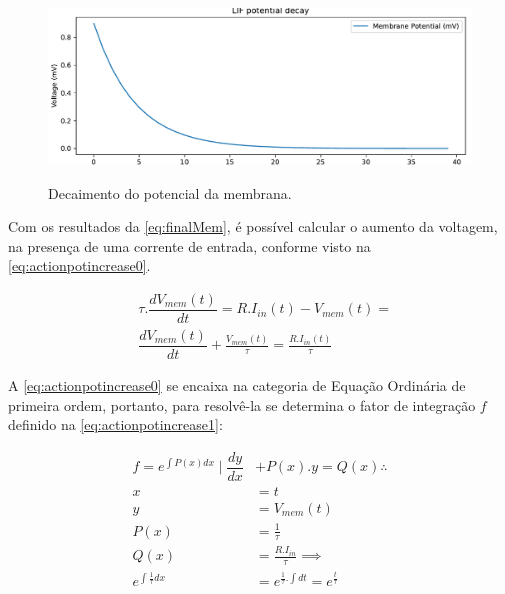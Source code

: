			
			
			\begin{figure}[H]
				\centering
				\caption{Decaimento do potencial da membrana.}
				\includegraphics[width=.7\linewidth]{images/membranePotentialDecay}
				\label{fig:membranepotentialdecay}
			\end{figure}
			
			\par Com os resultados da \autoref{eq:finalMem}, é possível calcular o aumento da voltagem, na presença de uma corrente de entrada, conforme visto na \autoref{eq:actionpotincrease0}.
			
			\begin{equation}
				\label{eq:actionpotincrease0}
				\begin{aligned}
					&\tau.\dfrac{dV_{mem}(t)}{dt} = R.I_{in}(t) - V_{mem}(t) = \\
					&\dfrac{dV_{mem}(t)}{dt} + \frac{V_{mem}(t)}{\tau} = \frac{R.I_{in}(t)}{\tau}
				\end{aligned}
			\end{equation}
			
			\par A \autoref{eq:actionpotincrease0} se encaixa na categoria de Equação Ordinária de primeira ordem, portanto, para resolvê-la se determina o fator de integração $f$ definido na \autoref{eq:actionpotincrease1}:
			
			\begin{equation}
				\label{eq:actionpotincrease1}
				\begin{aligned}
					f = e^{\int P(x) dx} \mid \dfrac{dy}{dx}&+P(x).y=Q(x) \therefore\\
					x &= t \\
					y &= V_{mem}(t) \\
					P(x) &= \frac{1}{\tau} \\
					Q(x) &= \frac{R.I_{in}}{\tau} \implies \\
					e^{\int \frac{1}{\tau} dx} &= e^{\frac{1}{\tau}.\int dt} = \boxed{e^{\frac{t}{\tau}}}
				\end{aligned}
			\end{equation}
			

